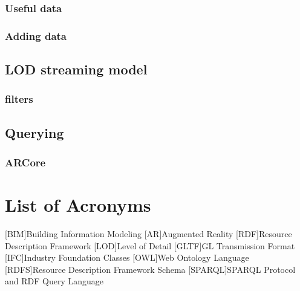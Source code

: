 \documentclass[12pt,a4paper,faculty=ea,language=en,doctype=report]{ugent-doc}
\begin{document}
    \subsection{Useful data}
    \subsection{Adding data}
  \section{LOD streaming model}  
    \subsection{filters}
  \section{Querying}    
    \subsection{ARCore}


% 
\clearpage
\chapter*{List of Acronyms}
\begin{acronym}[JSONP]\itemsep2pt\hypersetup{hidelinks}
  [BIM]{Building Information Modeling}
  [AR]{Augmented Reality}
  [RDF]{Resource Description Framework}
  [LOD]{Level of Detail}
  [GLTF]{GL Transmission Format}
  [IFC]{Industry Foundation Classes}
  [OWL]{Web Ontology Language}
  [RDFS]{Resource Description Framework Schema}
  [SPARQL]{SPARQL Protocol and RDF Query Language}
\end{acronym}
\printbibliography[heading=bibintoc,title={References}]
\end{document}
